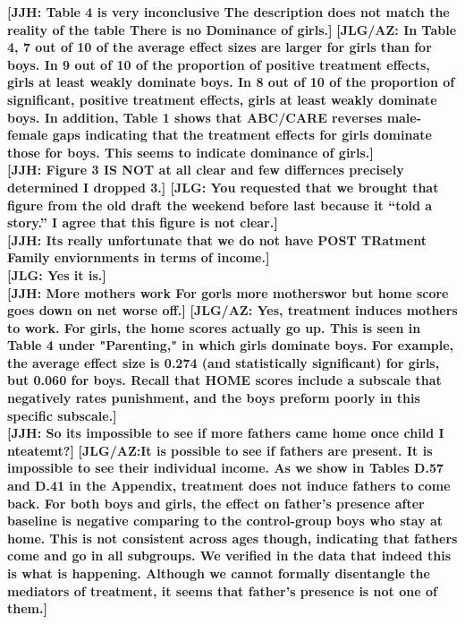 \noindent \textbf{[JJH: Table 4 is very inconclusive The description does not match the reality of the table  There is no Dominance of girls.]} \textbf{[JLG/AZ:  In Table 4, 7 out of 10 of the average effect sizes are larger for girls than for boys. In 9 out of 10 of the proportion of positive treatment effects, girls at least weakly dominate boys. In 8 out of 10 of the proportion of significant, positive treatment effects, girls at least weakly dominate boys. In addition, Table 1 shows that ABC/CARE reverses male-female gaps indicating that the treatment effects for girls dominate those for boys. This seems to indicate dominance of girls.]}\\

\noindent \textbf{[JJH: Figure 3 IS NOT at all clear and few differnces precisely determined I dropped 3.] [JLG: You requested that we brought that figure from the old draft the weekend before last because it ``told a story.'' I agree that this figure is not clear.]} \\

\noindent \textbf{[JJH: Its really unfortunate that we do not have POST TRatment Family enviornments in terms of income.]} \\\textbf{[JLG: Yes it is.]}\\

\noindent \textbf{[JJH: More mothers work  For gorls more motherswor but home score goes down  on net worse off.]}  \textbf{[JLG/AZ: Yes, treatment induces mothers to work. For girls, the home scores actually go up. This is seen in Table 4 under "Parenting," in which girls dominate boys. For example, the average effect size is 0.274 (and statistically significant) for girls, but 0.060 for boys. Recall that HOME scores include a subscale that negatively rates punishment, and the boys preform poorly in this specific subscale.]}\\

\noindent \textbf{[JJH: So its impossible to see if more fathers came home once child I nteatemt?]} \textbf{[JLG/AZ:It is possible to see if fathers are present. It is impossible to see their individual income. As we show in Tables D.57 and D.41 in the Appendix, treatment does not induce fathers to come back. For both boys and girls, the effect on father's presence after baseline is negative comparing to the control-group boys who stay at home. This is not consistent across ages though, indicating that fathers come and go in all subgroups. We verified in the data that indeed this is what is happening. Although we cannot formally disentangle the mediators of treatment, it seems that father's presence is not one of them.]}

























